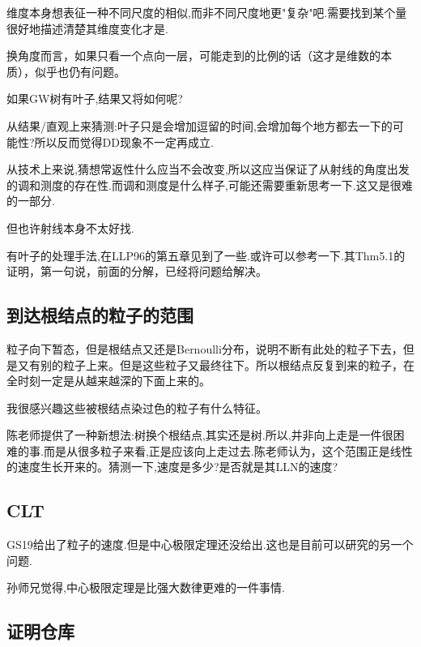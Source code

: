 \documentclass[a4paper,oneside]{ctexbook}
\begin{document}
							维度本身想表征一种不同尺度的相似,而非不同尺度地更"复杂"吧.需要找到某个量很好地描述清楚其维度变化才是.

						换角度而言，如果只看一个点向一层，可能走到的比例的话（这才是维数的本质），似乎也仍有问题。

					\begin{que}

						如果GW树有叶子,结果又将如何呢?
					
					\end{que}

						从结果/直观上来猜测:叶子只是会增加逗留的时间,会增加每个地方都去一下的可能性?所以反而觉得DD现象不一定再成立.

						从技术上来说,猜想常返性什么应当不会改变,所以这应当保证了从射线的角度出发的调和测度的存在性.而调和测度是什么样子,可能还需要重新思考一下.这又是很难的一部分.

						但也许射线本身不太好找.

						有叶子的处理手法,在LLP96的第五章见到了一些.或许可以参考一下.其Thm5.1的证明，第一句说，前面的分解，已经将问题给解决。


	\subsection{到达根结点的粒子的范围}
		
		粒子向下暂态，但是根结点又还是Bernoulli分布，说明不断有此处的粒子下去，但是又有别的粒子上来。但是这些粒子又最终往下。所以根结点反复到来的粒子，在全时刻一定是从越来越深的下面上来的。

		我很感兴趣这些被根结点染过色的粒子有什么特征。

		陈老师提供了一种新想法:树换个根结点,其实还是树.所以,并非向上走是一件很困难的事.而是从很多粒子来看,正是应该向上走过去.陈老师认为，这个范围正是线性的速度生长开来的。猜测一下,速度是多少?是否就是其LLN的速度?

	\subsection{CLT}

		GS19\cite{GS19}给出了粒子的速度.但是中心极限定理还没给出.这也是目前可以研究的另一个问题.

		孙师兄觉得,中心极限定理是比强大数律更难的一件事情.

	\subsection{证明仓库}
\end{document}

